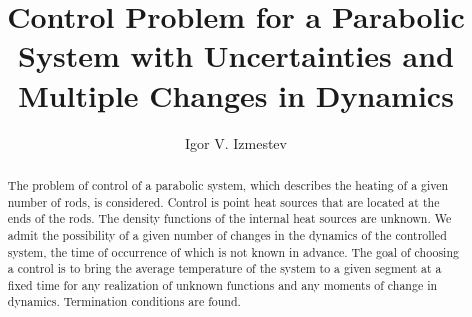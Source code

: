 \begin{englishtitle} %
\title{Control Problem for a Parabolic System with Uncertainties and Multiple Changes in Dynamics}
\author{Igor V. Izmestev 
}

\maketitle

\begin{abstract}

The problem of control of a parabolic system, which describes the heating of a given number of rods, is considered. Control is point heat sources that are located at the ends of the rods. The density functions of the internal heat sources are unknown. We admit the possibility of a given number of changes in the dynamics of the controlled system, the time of occurrence of which is not known in advance. The goal of choosing a control is to bring the average temperature of the system to a given segment at a fixed time for any realization of unknown functions and any moments of change in dynamics. Termination conditions are found.

\end{abstract}
\end{englishtitle}


\iffalse
%
%


\documentclass[12pt]{llncs}  


\usepackage{iftex}

\ifPDFTeX
\usepackage[T2A]{fontenc}
\usepackage[utf8]{inputenc} %
\usepackage[english,russian]{babel}
\fi

\usepackage{todonotes} 

